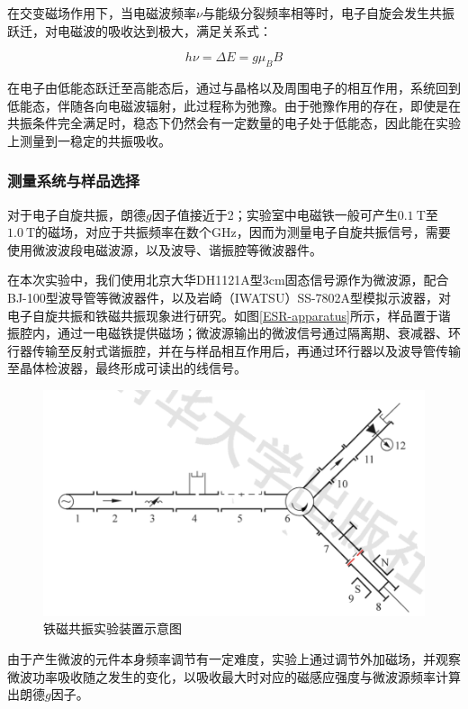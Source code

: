 \documentclass{thuemp}
\begin{document}
    在交变磁场作用下，当电磁波频率$\nu$与能级分裂频率相等时，电子自旋会发生共振跃迁，对电磁波的吸收达到极大，满足关系式：
    
    \begin{equation}
    h \nu  = \Delta E = g \mu_B B
    \end{equation}
    
    在电子由低能态跃迁至高能态后，通过与晶格以及周围电子的相互作用，系统回到低能态，伴随各向电磁波辐射，此过程称为弛豫。由于弛豫作用的存在，即使是在共振条件完全满足时，稳态下仍然会有一定数量的电子处于低能态，因此能在实验上测量到一稳定的共振吸收。
    
    \subsubsection{测量系统与样品选择}
    
    对于电子自旋共振，朗德$g$因子值接近于2；实验室中电磁铁一般可产生$0.1 ~\text{T} $至$1.0~\text{T}$的磁场，对应于共振频率在数个\si{\giga\hertz}，因而为测量电子自旋共振信号，需要使用微波波段电磁波源，以及波导、谐振腔等微波器件。
    
    在本次实验中，我们使用北京大华DH1121A型3\si{\centi\meter}固态信号源作为微波源，配合BJ-100型波导管等微波器件，以及岩崎（IWATSU）SS-7802A型模拟示波器，对电子自旋共振和铁磁共振现象进行研究。如图\ref{ESR-apparatus}所示，样品置于谐振腔内，通过一电磁铁提供磁场；微波源输出的微波信号通过隔离期、衰减器、环行器传输至反射式谐振腔，并在与样品相互作用后，再通过环行器以及波导管传输至晶体检波器，最终形成可读出的线信号。
    
    \begin{figure}[H]
        \centering
        \includegraphics[width=0.8\linewidth]{./ESR-apparatus.png}
        \caption{铁磁共振实验装置示意图} \label{fig:ESR-apparatus}
    \end{figure}
    
    由于产生微波的元件本身频率调节有一定难度，实验上通过调节外加磁场，并观察微波功率吸收随之发生的变化，以吸收最大时对应的磁感应强度与微波源频率计算出朗德$g$因子。
    
\end{document}
